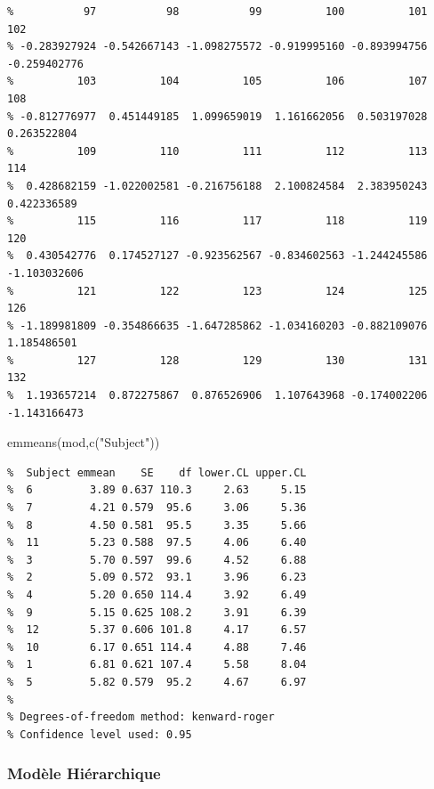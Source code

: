 \documentclass[
]{article}
\newenvironment{Shaded}{\begin{snugshade}}{\end{snugshade}}
\newcommand{\FunctionTok}[1]{\textcolor[rgb]{0.00,0.00,0.00}{#1}}
\newcommand{\NormalTok}[1]{#1}
\newcommand{\StringTok}[1]{\textcolor[rgb]{0.31,0.60,0.02}{#1}}
\begin{document}
\begin{verbatim}
%           97           98           99          100          101          102 
% -0.283927924 -0.542667143 -1.098275572 -0.919995160 -0.893994756 -0.259402776 
%          103          104          105          106          107          108 
% -0.812776977  0.451449185  1.099659019  1.161662056  0.503197028  0.263522804 
%          109          110          111          112          113          114 
%  0.428682159 -1.022002581 -0.216756188  2.100824584  2.383950243  0.422336589 
%          115          116          117          118          119          120 
%  0.430542776  0.174527127 -0.923562567 -0.834602563 -1.244245586 -1.103032606 
%          121          122          123          124          125          126 
% -1.189981809 -0.354866635 -1.647285862 -1.034160203 -0.882109076  1.185486501 
%          127          128          129          130          131          132 
%  1.193657214  0.872275867  0.876526906  1.107643968 -0.174002206 -1.143166473
\end{verbatim}

\begin{Shaded}
\begin{Highlighting}[]
\FunctionTok{emmeans}\NormalTok{(mod,}\FunctionTok{c}\NormalTok{(}\StringTok{"Subject"}\NormalTok{))}
\end{Highlighting}
\end{Shaded}

\begin{verbatim}
%  Subject emmean    SE    df lower.CL upper.CL
%  6         3.89 0.637 110.3     2.63     5.15
%  7         4.21 0.579  95.6     3.06     5.36
%  8         4.50 0.581  95.5     3.35     5.66
%  11        5.23 0.588  97.5     4.06     6.40
%  3         5.70 0.597  99.6     4.52     6.88
%  2         5.09 0.572  93.1     3.96     6.23
%  4         5.20 0.650 114.4     3.92     6.49
%  9         5.15 0.625 108.2     3.91     6.39
%  12        5.37 0.606 101.8     4.17     6.57
%  10        6.17 0.651 114.4     4.88     7.46
%  1         6.81 0.621 107.4     5.58     8.04
%  5         5.82 0.579  95.2     4.67     6.97
% 
% Degrees-of-freedom method: kenward-roger 
% Confidence level used: 0.95
\end{verbatim}

\hypertarget{moduxe8le-hiuxe9rarchique}{%
\subsubsection{Modèle Hiérarchique}\label{moduxe8le-hiuxe9rarchique}}
\end{document}

